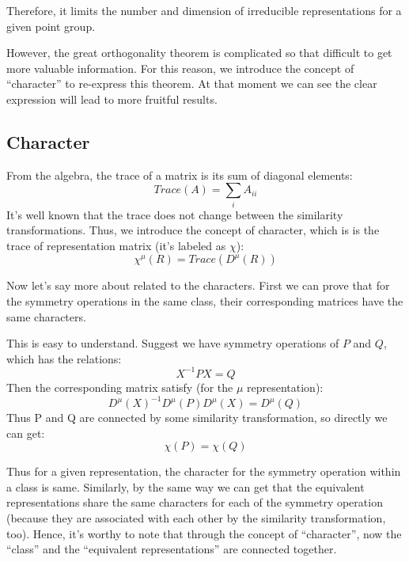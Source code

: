 Therefore, it limits the number and dimension of irreducible
representations for a given point group.

However, the great orthogonality theorem is complicated so that
difficult to get more valuable information. For this reason, we
introduce the concept of ``character'' to re-express this theorem.  At
that moment we can see the clear expression will lead to more fruitful
results.

\subsection{Character}
%
%
%
From the algebra, the trace of a matrix is its sum of diagonal
elements:
\begin{equation}\label{}
  Trace(A) = \sum_{i} A_{ii}
\end{equation}
It's well known that the trace does not change between the similarity
transformations. Thus, we introduce the concept of character, which is
is the trace of representation matrix (it's labeled as $\chi$):
\begin{equation}\label{}
  \chi^{\mu}(R) = Trace(D^{\mu}(R))
\end{equation}

Now let's say more about related to the characters. First we can prove
that for the symmetry operations in the same class, their
corresponding matrices have the same characters.

This is easy to understand. Suggest we have symmetry operations of $P$
and $Q$, which has the relations:
\begin{equation}\label{}
  X^{-1}PX = Q
\end{equation}
Then the corresponding matrix satisfy (for the $\mu$ representation):
\begin{equation}\label{}
  D^{\mu}(X)^{-1}D^{\mu}(P)D^{\mu}(X) = D^{\mu}(Q)
\end{equation}
Thus P and Q are connected by some similarity transformation, so
directly we can get:
\begin{equation}\label{}
  \chi(P) = \chi(Q)
\end{equation}

Thus for a given representation, the character for the symmetry
operation within a class is same. Similarly, by the same way we can
get that the equivalent representations share the same characters for
each of the symmetry operation (because they are associated with each
other by the similarity transformation, too). Hence, it's worthy to
note that through the concept of ``character'', now the ``class'' and
the ``equivalent representations'' are connected together.

